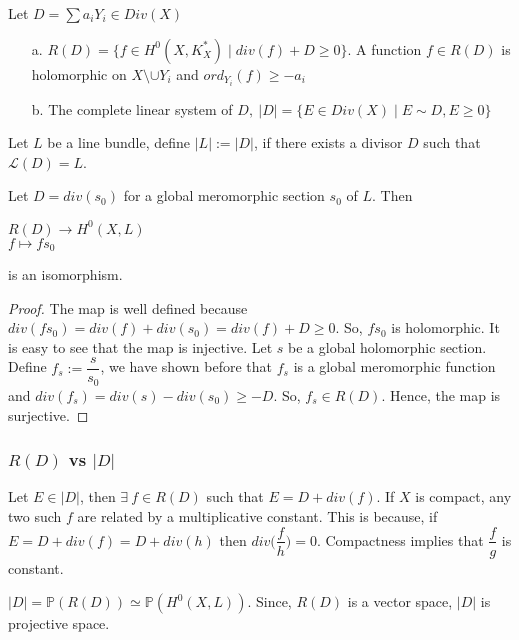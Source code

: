 Let $D=\sum a_{i}Y_{i} \in Div(X)$
\begin{definition}

\begin{itemize}
\item[a.]$R(D)=\{f\in H^0(X,K^*_{X})\mid div(f)+D \geq 0\}$.
A function $f \in R(D)$ is holomorphic on $X \setminus \cup Y_{i}$ and $ord_{Y_{i}}(f) \geq -a_{i}$

\item[b.] The complete linear system of $D,~|D|=\{E\in Div(X) \mid E\sim D, E \geq 0\}$ 

\end{itemize}

\end{definition}

Let $L$ be a line bundle, define $|L|:=|D|$, if there exists a divisor $D$ such that $\mathcal{L}(D)=L$.

\begin{lemma}

Let $D=div(s_{0})$ for a global meromorphic section $s_{0}$ of $L$. Then
\begin{center}
$R(D) \rightarrow H^0(X,L)$\\
$f \mapsto fs_{0}$
\end{center}
is an isomorphism.
\end{lemma}

\begin{proof}
The map is well defined because $div(fs_{0})=div(f)+div(s_{0})=div(f)+D\geq0$. So, $fs_{0}$ is holomorphic. 
It is easy to see that the map is injective.
Let $s$ be a global holomorphic section. Define $f_{s}:=\dfrac{s}{s_{0}}$, we have shown before that $f_{s}$ is a global meromorphic function and $div(f_{s})=div(s)-div(s_{0}) \geq-D$. So, $f_{s} \in R(D)$. Hence, the map is surjective.
\end{proof}

\subsubsection{$R(D)$ vs $|D|$}

Let $E \in |D|$, then $\exists~f \in R(D)$ such that $E=D+div(f)$.
If $X$ is compact, any two such $f$ are related by a multiplicative constant. This is because, if $E=D+div(f)=D+div(h)$ then $div\bigg(\dfrac{f}{h}\bigg)=0$. Compactness implies that $\dfrac{f}{g}$ is constant.

\begin{corollary}
$|D|=\mathbb{P}(R(D)) \simeq \mathbb{P}(H^0(X,L))$. Since, $R(D)$ is a vector space, $|D|$ is projective space.
\end{corollary}

